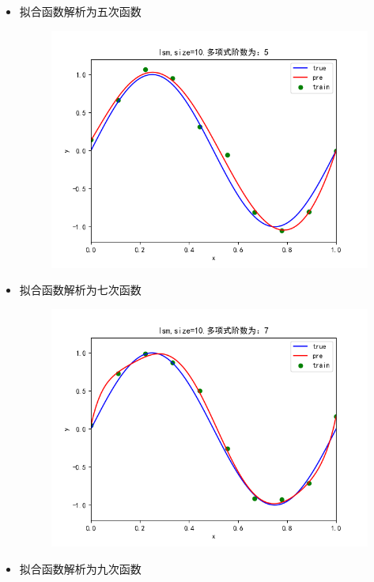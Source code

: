 \documentclass[lang=cn,a4paper,cite=authoryear]{elegantpaper}
\begin{document}
\begin{itemize}
	\item 拟合函数解析为五次函数
	\begin{figure}[H]
		\centering
		\includegraphics[scale=0.5]{5}
	\end{figure}
    \item 拟合函数解析为七次函数
    \begin{figure}[H]
    	\centering
    	\includegraphics[scale=0.5]{7}
    \end{figure}
    \item 拟合函数解析为九次函数
    \begin{figure}[H]
    	\centering

\end{figure}
\end{itemize}
\end{document}
